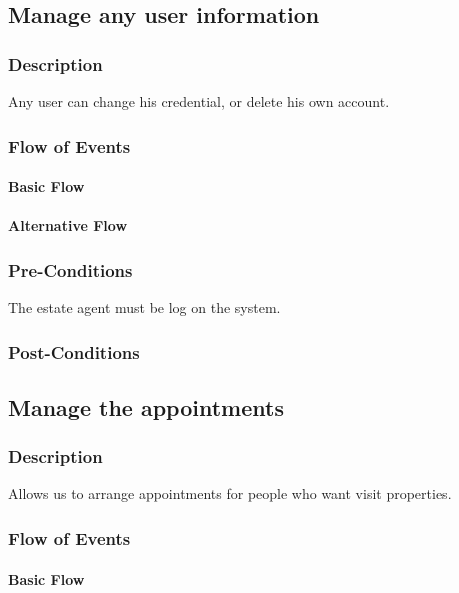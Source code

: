 \documentclass[a4paper,12pt]{article}
\begin{document}
\subsection{Manage any user information}
\subsubsection{Description}
Any user can change his credential, or delete his own account.
\subsubsection{Flow of Events}
\paragraph{Basic Flow}
\begin{itemize}
\end{itemize}
\paragraph{Alternative Flow}
\begin{itemize}
\end{itemize}
\subsubsection{Pre-Conditions}
The estate agent must be log on the system.
\subsubsection{Post-Conditions}

\subsection{Manage the appointments}
\subsubsection{Description}
Allows us to arrange appointments for people who want visit properties.
\subsubsection{Flow of Events}
\paragraph{Basic Flow}
\begin{itemize}
\end{itemize}
\end{document}
